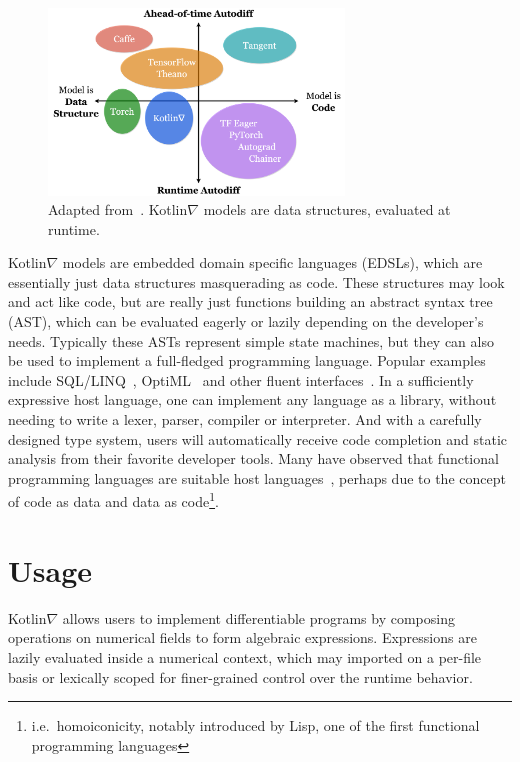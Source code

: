 \documentclass[12pt,initial,twoside,maitrise]{dms}
\numberwithin{equation}{section}
\numberwithin{table}{chapter}
\numberwithin{figure}{chapter}
\begin{document}
\begin{figure}
    \centering
    \includegraphics[width=0.70\textwidth]{kotlingrad_diagram.png}
    \caption{Adapted from~\cite{van2018tangent}. Kotlin$\nabla$ models are data structures, evaluated at runtime.}
    \label{fig:kotlingrad_digram}
\end{figure}

Kotlin$\nabla$ models are embedded domain specific languages (EDSLs), which are essentially just data structures masquerading as code. These structures may look and act like code, but are really just functions building an abstract syntax tree (AST), which can be evaluated eagerly or lazily depending on the developer's needs. Typically these ASTs represent simple state machines, but they can also be used to implement a full-fledged programming language. Popular examples include SQL/LINQ~\cite{meijer2006linq}, OptiML~\cite{sujeeth2011optiml} and other fluent interfaces~\cite{fowler05fluent}. In a sufficiently expressive host language, one can implement any language as a library, without needing to write a lexer, parser, compiler or interpreter. And with a carefully designed type system, users will automatically receive code completion and static analysis from their favorite developer tools. Many have observed that functional programming languages are suitable host languages~\cite{elliott2003compiling,rompf2010lightweight}, perhaps due to the concept of code as data and data as code\footnote{i.e.\ homoiconicity, notably introduced by Lisp, one of the first functional programming languages}.

\section{Usage}

Kotlin$\nabla$ allows users to implement differentiable programs by composing operations on numerical fields to form algebraic expressions. Expressions are lazily evaluated inside a numerical context, which may imported on a per-file basis or lexically scoped for finer-grained control over the runtime behavior.
\end{document}
